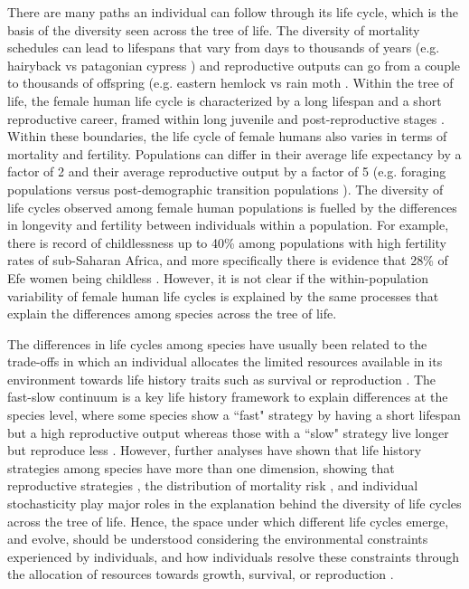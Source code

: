 \documentclass{article}
\begin{document}
There are many paths an individual can follow through its life cycle, which is the basis of the diversity seen across the tree of life. The diversity of mortality schedules can lead to lifespans that vary from days to thousands of years (e.g. hairyback vs patagonian cypress \citep{balsamo1988life,lara19933620}) and reproductive outputs can go from a couple to thousands of offspring (e.g. eastern hemlock vs rain moth \citep{tindale1932revision,van2017lifetime}. Within the tree of life, the female human life cycle is characterized by a long lifespan and a short reproductive career, framed within long juvenile and post-reproductive stages \citep{kaplan2000theory}. Within these boundaries, the life cycle of female humans also varies in terms of mortality and fertility. Populations can differ in their average life expectancy by a factor of 2 and their average reproductive output by a factor of 5 (e.g. foraging populations \citep{migliano2007life} versus post-demographic transition populations \citep{de2017maximum}). The diversity of life cycles observed among female human populations is fuelled by the differences in longevity and fertility between individuals within a population. For example, there is record of childlessness up to 40\% among populations with high fertility rates of sub-Saharan Africa, and more specifically there is evidence that 28\% of Efe women being childless \citep{bailey1995sexuality,belsey1976epidemiology}. However, it is not clear if the within-population variability of female human life cycles is explained by the same processes that explain the differences among species across the tree of life. 

The differences in life cycles among species have usually been related to the trade-offs in which an individual allocates the limited resources available in its environment towards life history traits such as survival or reproduction \citep{stearns2000life}. The fast-slow continuum is a key life history framework to explain differences at the species level, where some species show a ``fast" strategy by having a short lifespan but a high reproductive output whereas those with a ``slow" strategy live longer but reproduce less \citep{stearns1983influence}. However, further analyses have shown that life history strategies among species have more than one dimension, showing that reproductive strategies \citep{salguero2016fast}, the distribution of mortality risk \citep{healy2019animal}, and individual stochasticity \citep{varas2022individual} play major roles in the explanation behind the diversity of life cycles across the tree of life. Hence, the space under which different life cycles emerge, and evolve, should be understood considering the environmental constraints experienced by individuals, and how individuals resolve these constraints through the allocation of resources towards growth, survival, or reproduction \citep{white2022metabolic}.
\end{document}
